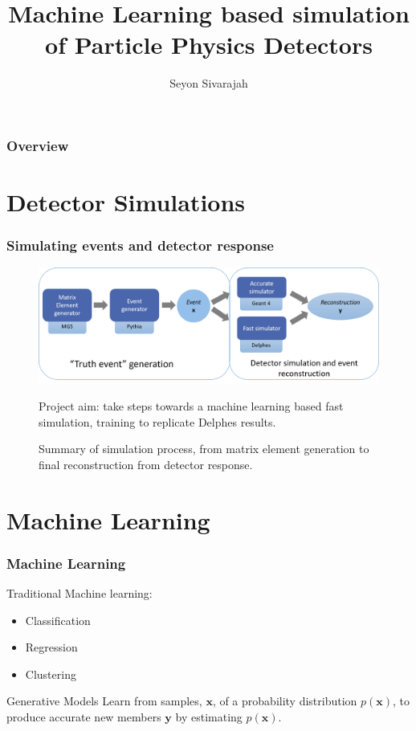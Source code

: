 \documentclass{beamer}
\title{Machine Learning based simulation of Particle Physics Detectors}
\author{Seyon Sivarajah}
\date{\displaydate{date}}
\begin{document}
	
	\frame{\titlepage}
	\begin{frame}
		\frametitle{Overview}
		\tableofcontents
	\end{frame}
	
	\section{Detector Simulations}
	\label{sec:detsims}
	
		\begin{frame}
			\frametitle{Simulating events and detector response}
			\begin{figure}[H]
				\centering
				\includegraphics[width=1.0\linewidth]{simdiag}
				
				\caption{Summary of simulation process, from matrix element generation to final reconstruction from detector response.}
				\label{fig:simdiag}
			\alert{Project aim:} take steps towards a machine learning based fast simulation, training to replicate Delphes results. 
			\end{figure}
		\end{frame}
	
	\section{Machine Learning}
	\label{sec:gans}
		\begin{frame}
		\frametitle{Machine Learning}
		Traditional Machine learning:
		\begin{itemize}
			\item Classification 
			\item Regression
			\item Clustering
		\end{itemize} 
		\begin{block}{Generative Models}
			Learn from samples, $\mathbf{x}$, of a probability distribution $p(\mathbf{x})$, to produce accurate new members $\mathbf{y}$ by estimating $p(\mathbf{x})$. 
		\end{block}
		\end{frame}
	
\end{document}
